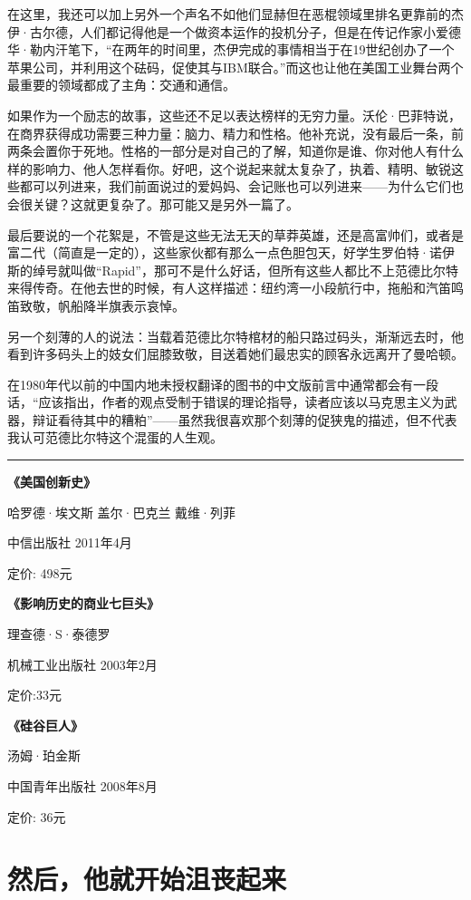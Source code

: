 在这里，我还可以加上另外一个声名不如他们显赫但在恶棍领域里排名更靠前的杰伊·古尔德，人们都记得他是一个做资本运作的投机分子，但是在传记作家小爱德华·勒内汗笔下，``在两年的时间里，杰伊完成的事情相当于在19世纪创办了一个苹果公司，并利用这个砝码，促使其与IBM联合。''而这也让他在美国工业舞台两个最重要的领域都成了主角：交通和通信。

如果作为一个励志的故事，这些还不足以表达榜样的无穷力量。沃伦·巴菲特说，在商界获得成功需要三种力量：脑力、精力和性格。他补充说，没有最后一条，前两条会置你于死地。性格的一部分是对自己的了解，知道你是谁、你对他人有什么样的影响力、他人怎样看你。好吧，这个说起来就太复杂了，执着、精明、敏锐这些都可以列进来，我们前面说过的爱妈妈、会记账也可以列进来------为什么它们也会很关键？这就更复杂了。那可能又是另外一篇了。

最后要说的一个花絮是，不管是这些无法无天的草莽英雄，还是高富帅们，或者是富二代（简直是一定的），这些家伙都有那么一点色胆包天，好学生罗伯特·诺伊斯的绰号就叫做``Rapid''，那可不是什么好话，但所有这些人都比不上范德比尔特来得传奇。在他去世的时候，有人这样描述：纽约湾一小段航行中，拖船和汽笛鸣笛致敬，帆船降半旗表示哀悼。

另一个刻薄的人的说法：当载着范德比尔特棺材的船只路过码头，渐渐远去时，他看到许多码头上的妓女们屈膝致敬，目送着她们最忠实的顾客永远离开了曼哈顿。

在1980年代以前的中国内地未授权翻译的图书的中文版前言中通常都会有一段话，``应该指出，作者的观点受制于错误的理论指导，读者应该以马克思主义为武器，辩证看待其中的糟粕''------虽然我很喜欢那个刻薄的促狭鬼的描述，但不代表我认可范德比尔特这个混蛋的人生观。

\begin{center}\rule{3in}{0.4pt}\end{center}

\textbf{《美国创新史》}

哈罗德·埃文斯 盖尔·巴克兰 戴维·列菲

中信出版社 2011年4月

定价: 498元

\textbf{《影响历史的商业七巨头》}

理查德·S·泰德罗

机械工业出版社 2003年2月

定价:33元

\textbf{《硅谷巨人》}

汤姆·珀金斯

中国青年出版社 2008年8月

定价: 36元

\section{然后，他就开始沮丧起来}

